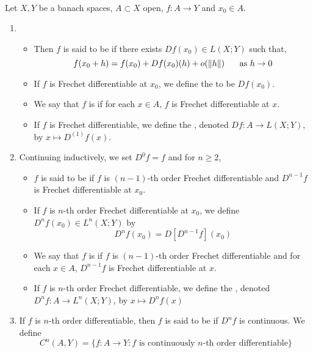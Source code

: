 \documentclass{book}
\begin{document}
	\begin{defn}  \\
	Let $X, Y$ be a banach spaces, $A \subset X$ open, $f:A \rightarrow Y$ and $x_0 \in A$. 
	\begin{enumerate}
	\item 
	\begin{itemize}
	\item Then $f$ is said to be  if there exists $Df(x_0) \in L(X; Y)$ such that, $$f(x_0 + h) = f(x_0) + Df(x_0)(h) + o(\|h\| ) \hspace{.5cm} \text{ as } h \rightarrow 0$$  
	\item If $f$ is Frechet differentiable at $x_0$, we define the  to be $Df(x_0)$. 
	\item We say that $f$ is  if for each $x \in A$, $f$ is Frechet differentiable at $x$. 
	\item If $f$ is Frechet differentiable, we define the , denoted $Df:A \rightarrow L(X; Y)$, by $x \mapsto D^{(1)}f(x)$. 
	\end{itemize}
	\item Continuing inductively, we set $D^0f = f$ and for $n \geq 2$, 
	\begin{itemize}
	\item $f$ is said to be  if $f$ is $(n-1)$-th order Frechet differentiable and $D^{n-1}f$ is Frechet differentiable at $x_0$. 
	\item If $f$ is $n$-th order Frechet differentiable at $x_0$, we define $D^nf(x_0) \in L^n(X; Y)$ by 
	$$D^nf(x_0) = D[D^{n-1}f](x_0)$$ 
	\item We say that $f$ is  if $f$ is $(n-1)$-th order Frechet differentiable and for each $x \in A$, $D^{n-1}f$ is Frechet differentiable at $x$. 
	\item If $f$ is $n$-th order Frechet differentiable, we define the , denoted $D^nf:A \rightarrow  L^n(X; Y)$, by $x \mapsto D^{n}f(x)$ \\
	\end{itemize}		
	\item If $f$ is $n$-th order differentiable, then $f$ is said to be  if $D^nf$ is continuous. We define $$C^n(A,Y) = \{f:A \rightarrow Y: f \text{ is continuously $n$-th order differentiable}\}$$
	
	\end{enumerate}
	\end{defn}
	
\end{document}
